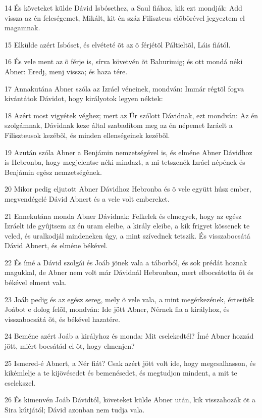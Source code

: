 \par 14 És követeket külde Dávid Isbósethez, a Saul fiához, kik ezt mondják: Add vissza az én feleségemet, Mikált, kit én száz Filiszteus elõbõrével jegyeztem el magamnak.
\par 15 Elkülde azért Isbóset, és elvéteté õt az õ férjétõl Páltieltõl, Láis fiától.
\par 16 És vele ment az õ férje is, sírva követvén õt Bahurimig; és ott mondá néki Abner: Eredj, menj vissza; és haza tére.
\par 17 Annakutána Abner szóla az Izráel véneinek, mondván: Immár régtõl fogva kivántátok Dávidot, hogy királyotok legyen néktek:
\par 18 Azért most vigyétek véghez; mert az Úr szólott Dávidnak, ezt mondván: Az én szolgámnak, Dávidnak keze által szabadítom meg az én népemet Izráelt a Filiszteusok kezébõl, és minden ellenségeinek kezébõl.
\par 19 Azután szóla Abner a Benjámin nemzetségével is, és elméne Abner Dávidhoz is Hebronba, hogy megjelentse néki mindazt, a mi tetszenék Izráel népének és Benjámin egész nemzetségének.
\par 20 Mikor pedig eljutott Abner Dávidhoz Hebronba és õ vele együtt húsz ember, megvendégelé Dávid Abnert és a vele volt embereket.
\par 21 Ennekutána monda Abner Dávidnak: Felkelek és elmegyek, hogy az egész Izráelt ide gyûjtsem az én uram eleibe, a király eleibe, a kik frigyet kössenek te veled, és uralkodjál mindeneken úgy, a mint szívednek tetszik. És visszabocsátá Dávid Abnert, és elméne békével.
\par 22 És ímé a Dávid szolgái és Joáb jõnek vala a táborból, és sok prédát hoznak magukkal, de Abner nem volt már Dávidnál Hebronban, mert elbocsátotta õt és békével elment vala.
\par 23 Joáb pedig és az egész sereg, mely õ vele vala, a mint megérkezének, értesíték Joábot e dolog felõl, mondván: Ide jött Abner, Nérnek fia a királyhoz, és visszabocsátá õt, és békével hazatére.
\par 24 Beméne azért Joáb a királyhoz és monda: Mit cselekedtél? Ímé Abner hozzád jött, miért bocsátád el õt, hogy elmenjen?
\par 25 Ismered-é Abnert, a Nér fiát? Csak azért jött volt ide, hogy megcsalhasson, és kikémlelje a te kijövésedet és bemenésedet, és megtudjon mindent, a mit te cselekszel.
\par 26 És kimenvén Joáb Dávidtól, követeket külde Abner után, kik visszahozák õt a Sira kútjától; Dávid azonban nem tudja vala.
